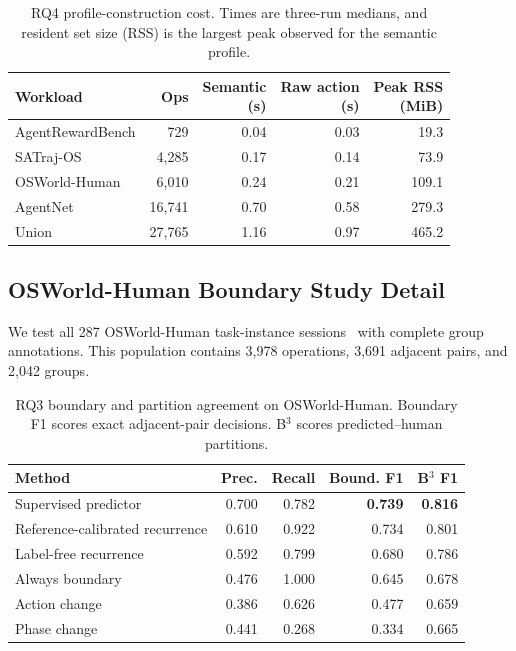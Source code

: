 \documentclass[letterpaper]{article}
\begin{document}
\begin{table}[h]
\centering\small
\setlength{\tabcolsep}{3pt}
\begin{tabular}{@{}lrrrr@{}}
\toprule
Workload & Ops & \shortstack{Semantic\\(s)} & \shortstack{Raw action\\(s)} & \shortstack{Peak RSS\\(MiB)} \\
\midrule
AgentRewardBench & 729 & 0.04 & 0.03 & 19.3 \\
SATraj-OS & 4{,}285 & 0.17 & 0.14 & 73.9 \\
OSWorld-Human & 6{,}010 & 0.24 & 0.21 & 109.1 \\
AgentNet & 16{,}741 & 0.70 & 0.58 & 279.3 \\
Union & 27{,}765 & 1.16 & 0.97 & 465.2 \\
\bottomrule
\end{tabular}
\caption{RQ4 profile-construction cost. Times are three-run medians, and
resident set size (RSS) is the largest peak observed for the semantic profile.}
\label{tab:rq4-cost}
\end{table}
\FloatBarrier

\subsection{OSWorld-Human Boundary Study Detail}
\label{app:osworld}

We test all 287 OSWorld-Human task-instance sessions~\cite{osworldhuman} with
complete group annotations. This population contains 3{,}978 operations,
3{,}691 adjacent pairs, and 2{,}042 groups.

\begin{table}[h]
\centering\small
\setlength{\tabcolsep}{2.0pt}
\begin{tabular}{@{}lrrrr@{}}
\toprule
Method & Prec. & Recall & Bound. F1 & B$^3$ F1 \\
\midrule
Supervised predictor & 0.700 & 0.782 & \textbf{0.739} & \textbf{0.816} \\
Reference-calibrated recurrence & 0.610 & 0.922 & 0.734 & 0.801 \\
Label-free recurrence & 0.592 & 0.799 & 0.680 & 0.786 \\
Always boundary & 0.476 & 1.000 & 0.645 & 0.678 \\
Action change & 0.386 & 0.626 & 0.477 & 0.659 \\
Phase change & 0.441 & 0.268 & 0.334 & 0.665 \\
\bottomrule
\end{tabular}
\caption{RQ3 boundary and partition agreement on OSWorld-Human. Boundary F1 scores
exact adjacent-pair decisions. B$^3$ scores predicted--human partitions.}
\label{tab:rq3-boundary}
\end{table}
\end{document}
